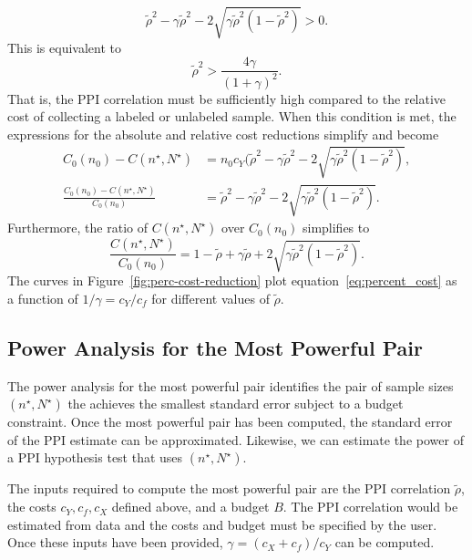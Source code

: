 \[
\tilde{\rho}^2 - \gamma\tilde{\rho}^2 -2\sqrt{\gamma \tilde{\rho}^2(1-\tilde{\rho}^2)} > 0.
\]
This is equivalent to
\[
\tilde{\rho}^2 > \frac{4 \gamma}{(1+\gamma)^2}.
\]
That is, the PPI correlation must be sufficiently high compared to the relative cost of collecting a labeled or unlabeled sample. When this condition is met, the expressions for the absolute and relative cost reductions simplify and become
\begin{align}
    C_0(n_0)-C(n^\star, N^\star) &= n_0c_Y(\tilde{\rho}^2 - \gamma \tilde{\rho}^2 - 2 \sqrt{\gamma \tilde{\rho}^2 (1-\tilde{\rho}^2)},\nonumber \\
    \frac{C_0(n_0)-C(n^\star, N^\star)}{C_0(n_0)}& =  \tilde{\rho}^2 - \gamma \tilde{\rho}^2 - 2 \sqrt{\gamma \tilde{\rho}^2(1-\tilde{\rho}^2)}.\nonumber
\end{align}
Furthermore, the ratio of $C(n^\star,N^\star)$ over $C_0(n_0)$ simplifies to 
\begin{equation}
    \frac{C(n^\star, N^\star)}{C_0(n_0)} = 1 - \tilde{\rho} +\gamma \tilde{\rho}+2\sqrt{\gamma \tilde{\rho}^2(1-\tilde{\rho}^2)}. \label{eq:percent_cost}
\end{equation}
The curves in Figure~\ref{fig:perc-cost-reduction} plot equation~\eqref{eq:percent_cost} as a function of $1/\gamma=c_Y/c_f$ for different values of $\tilde{\rho}$.

\subsection{Power Analysis for the Most Powerful Pair}\label{sec:most-powerful-pair}

The power analysis for the most powerful pair identifies the pair of sample sizes $(n^\star, N^\star)$ the achieves the smallest standard error subject to a budget constraint. Once the most powerful pair has been computed, the standard error of the PPI estimate can be approximated. Likewise, we can estimate the power of a PPI hypothesis test that uses $(n^\star, N^\star)$.

The inputs required to compute the most powerful pair are the PPI correlation $\tilde{\rho}$, the costs $c_Y, c_f, c_X$ defined above, and a budget $B$. The PPI correlation would be estimated from data and the costs and budget must be specified by the user. Once these inputs have been provided, $\gamma = (c_X+c_f)/c_Y$ can be computed. 

